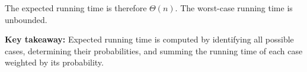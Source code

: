 \begin{prob}
\begin{soln}
\begin{itemize}
        The expected running time is therefore $\Theta(n)$.
        The worst-case running time is unbounded.
    \end{itemize}
    
    \textbf{Key takeaway:} Expected running time is computed by identifying all
    possible cases, determining their probabilities, and summing the running time
    of each case weighted by its probability.
    \end{soln}
    
    \end{prob}
